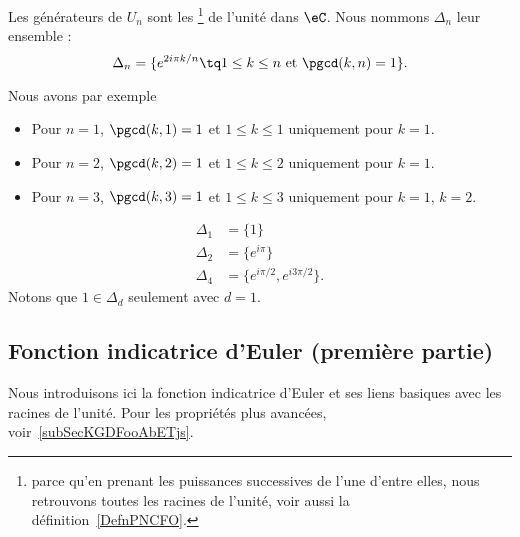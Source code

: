 \begin{definition}\label{DefLYGTooFPOYGZ}
	Les générateurs de \( U_n\) sont les \footnote{parce qu'en prenant les puissances successives de l'une d'entre elles, nous retrouvons toutes les racines de l'unité, voir aussi la définition~\ref{DefnPNCFO}.} de l'unité dans \( \eC\). Nous nommons \( \Delta_n\) leur ensemble :
	\begin{equation}
		\Delta_n=\{  e^{2i\pi k/n}\tq 1\leq k\leq n \text{ et } \pgcd(k,n)=1 \}.
	\end{equation}
\end{definition}
Nous avons par exemple

\begin{itemize}
    \item Pour \( n=1\), \( \pgcd(k,1)=1\) et \( 1\leq k\leq 1\) uniquement pour \( k=1\).
    \item Pour \( n=2\), \( \pgcd(k,2)=1\) et \( 1\leq k\leq 2\) uniquement pour \( k=1\).
    \item Pour \( n=3\), \( \pgcd(k,3)=1\) et \( 1\leq k\leq 3\) uniquement pour \( k=1\), \( k=2\).
\end{itemize}

\begin{subequations}
	\begin{align}
		\Delta_1 & =\{ 1 \}                          \\
		\Delta_2 & =\{ e^{i\pi } \}                  \\
		\Delta_4 & =\{ e^{i\pi /2}, e^{i 3\pi /2} \}.
	\end{align}
\end{subequations}
Notons que \( 1\in \Delta_d\) seulement avec \( d=1\).

\subsection{Fonction indicatrice d'Euler (première partie)}

Nous introduisons ici la fonction indicatrice d'Euler et ses liens basiques avec les racines de l'unité. Pour les propriétés plus avancées, voir~\ref{subSecKGDFooAbETjs}.


